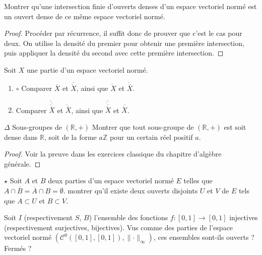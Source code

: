\documentclass[french,a4paper]{article}
\newcommand{\Z}{\mathbb{Z}}
\newcommand{\R}{\mathbb{R}}
\theoremstyle{plain}
\theoremstyle{definition}
\theoremstyle{remark}
\begin{document}
\begin{ex}{}
	Montrer qu'une intersection finie d'ouverts denses d'un espace vectoriel normé est un ouvert dense de ce même espace vectoriel normé.
\end{ex}
\begin{proof}
	Procéder par récurrence, il suffit donc de prouver que c'est le cas pour deux. On utilise la densité du premier pour obtenir une première intersection, puis appliquer la densité du second avec cette première intersection.
\end{proof}

\begin{ex}{}
	Soit $X$ une partie d'un espace vectoriel normé.
	\begin{enumerate}
		\item $\circ$ Comparer $\overline{X}$ et $\overline{\mathring{X}}$, ainsi que $\mathring{X}$ et $\mathring{\overline{X}}$.
		\item Comparer $\mathring{\overline{\mathring{\overline{X}}}}$ et $\mathring{\overline{X}}$, ainsi que $\overline{\mathring{\overline{\mathring{X}}}}$ et $\overline{\mathring{X}}$.
	\end{enumerate}
\end{ex}

\begin{ex}{$\Delta$ Sous-groupes de $(\R,+)$}
	Montrer que tout sous-groupe de $(\R,+)$ est soit dense dans $\R$, soit de la forme $a\Z$ pour un certain réel positif $a$.
\end{ex}
\begin{proof}
	Voir la preuve dans les exercices classique du chapitre d'algèbre générale.
\end{proof}

\begin{ex}{$\star$}
	Soit $A$ et $B$ deux parties d'un espace vectoriel normé $E$ telles que $A\cap\overline{B}=\overline{A}\cap B=\emptyset$. montrer qu'il existe deux ouverts disjoints $U$ et $V$ de $E$ tels que $A\subset U$ et $B\subset V$.
\end{ex}

\begin{ex}{}
	Soit $I$ (respectivement $S$, $B$) l'ensemble des fonctions $f:[0,1]\to[0,1]$ injectives (respectivement surjectives, bijectives). Vus comme des parties de l'espace vectoriel normé $(\mathcal{C}^0([0,1],[0,1]),\lVert\cdot\rVert_\infty)$, ces ensembles sont-ils ouverts ? Fermés ?
\end{ex}
\end{document}

